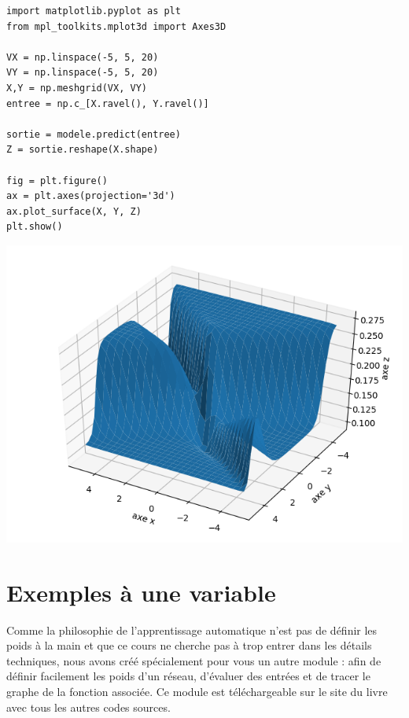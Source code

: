 \documentclass[11pt,class=report,crop=false]{standalone}
\begin{document}
\begin{minipage}{0.5\textwidth}
\begin{lstlisting}
import matplotlib.pyplot as plt
from mpl_toolkits.mplot3d import Axes3D

VX = np.linspace(-5, 5, 20)
VY = np.linspace(-5, 5, 20)
X,Y = np.meshgrid(VX, VY)
entree = np.c_[X.ravel(), Y.ravel()]

sortie = modele.predict(entree)
Z = sortie.reshape(X.shape)

fig = plt.figure()
ax = plt.axes(projection='3d')
ax.plot_surface(X, Y, Z)
plt.show()
\end{lstlisting}
\end{minipage}
\begin{minipage}{0.49\textwidth}
\begin{center}
\includegraphics[scale=\myscale,scale=0.5]{figures/pythontf-keras-02a}
\end{center}
\end{minipage}

\section{Exemples à une variable}
\label{sec:keras_facile}

Comme la philosophie de l'apprentissage automatique n'est pas de définir les poids à la main et que ce cours ne cherche pas à trop entrer dans les détails techniques, nous avons créé spécialement pour vous un autre module : 
afin de définir facilement les poids d'un réseau, d'évaluer des entrées et de tracer le graphe de la fonction associée. Ce module est téléchargeable sur le site du livre avec tous les autres codes sources.
\end{document}
